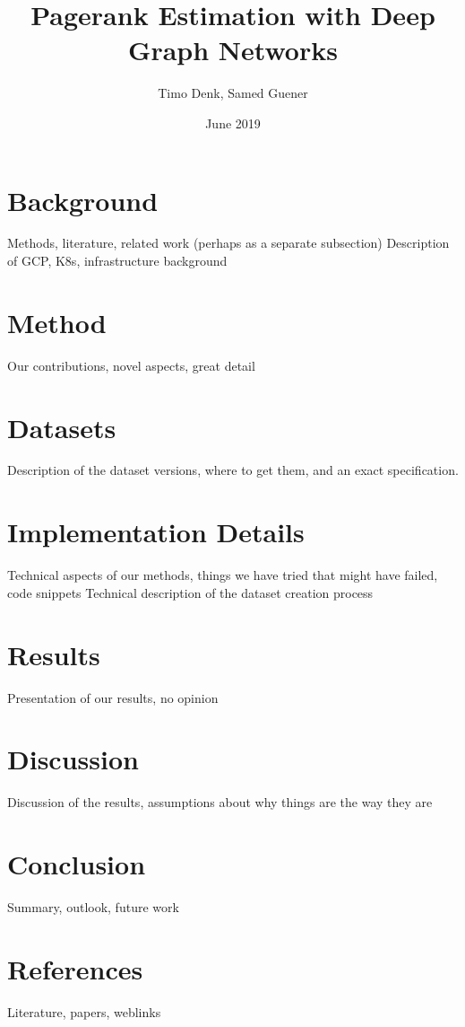 \documentclass{article}
\title{Pagerank Estimation with Deep Graph Networks}
\author{Timo Denk, Samed Guener}
\date{June 2019}
\begin{document}
\maketitle



\section{Background}
Methods, literature, related work (perhaps as a separate subsection)
Description of GCP, K8s, infrastructure background

\section{Method}
Our contributions, novel aspects, great detail

\section{Datasets}
Description of the dataset versions, where to get them, and an exact specification.

\section{Implementation Details}
Technical aspects of our methods, things we have tried that might have failed, code snippets
Technical description of the dataset creation process

\section{Results}
Presentation of our results, no opinion

\section{Discussion}
Discussion of the results, assumptions about why things are the way they are

\section{Conclusion}
Summary, outlook, future work

\section{References}
Literature, papers, weblinks
\printbibliography
\end{document}
